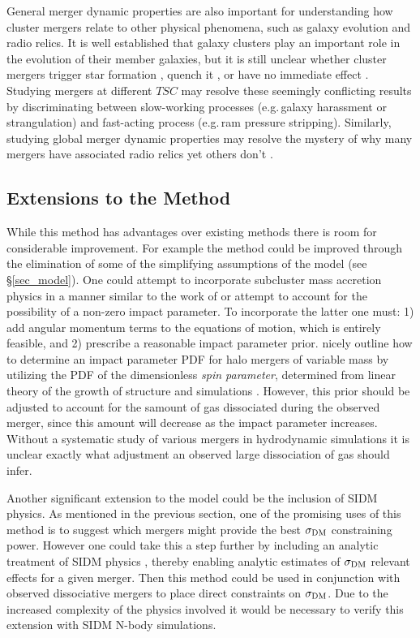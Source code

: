 General merger dynamic properties are also important for understanding  how cluster mergers relate to other physical phenomena, such as galaxy evolution and radio relics.  
It is well established that galaxy clusters play an important role in the evolution of their member galaxies, but it is still unclear whether cluster mergers trigger star formation \citep[e.g.][]{Miller:2003kx,Owen:2005dx,Ferrari:2005es,Hwang:2009ip}, quench it \citep{Poggianti:2004ca}, or have no immediate effect \citep{Chung:2010ds}.
Studying mergers at different $TSC$ may resolve these seemingly conflicting results by  discriminating between slow-working processes (e.g.\,galaxy harassment or strangulation) and fast-acting process (e.g.\,ram pressure stripping). 
Similarly, studying global merger dynamic properties may resolve the mystery of why many mergers have associated radio relics \citep[e.g.][]{Barrena:2009to, vanWeeren:2011ko} yet others don't \citep[e.g.][]{Russell:2011hn}.

\subsection{Extensions to the Method}\label{sec_extensions}

While this method has advantages over existing methods there is room for considerable improvement.
For example the method could be improved through the elimination of some of the simplifying assumptions of the model (see \S\ref{sec_model}).
One could attempt to incorporate subcluster mass accretion physics in a manner similar to the work of \citet{Angus:2007em} or attempt to account for the possibility of a non-zero impact parameter.
To incorporate the latter one must: 1) add angular momentum terms to the equations of motion,  which is entirely feasible, and 2) prescribe a reasonable impact parameter prior.
\citet{Randall:2002kk} nicely outline how to determine an impact parameter PDF for halo mergers of variable mass by utilizing the PDF of the dimensionless \emph{spin parameter}, determined from linear theory of the growth of structure \citep{Peebles:1993vp} and simulations \citep{Bullock:2001kb}.
However, this prior should be adjusted to account for the samount of gas dissociated during the observed merger, since this amount will decrease as the impact parameter increases.
Without a systematic study of various mergers in hydrodynamic simulations it is unclear exactly what adjustment an observed large dissociation of gas should infer.

Another significant extension to the model could be the inclusion of SIDM physics.  
As mentioned in the previous section, one of the promising uses of this method is to suggest which mergers might provide the best $\sigma_{\rm DM}$ constraining power.  
However one could take this a step further by including an analytic treatment of SIDM physics \citep[e.g.\,][]{Markevitch:2004dl}, thereby enabling analytic estimates of $\sigma_{\rm DM}$ relevant effects for a given merger.
Then this method could be used in conjunction with observed dissociative mergers to place direct constraints on $\sigma_{\rm DM}$.
Due to the increased complexity of the physics involved
it would be necessary to verify this extension with SIDM N-body simulations.

